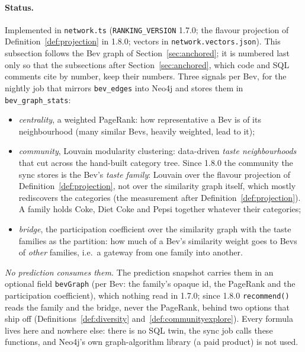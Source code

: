 \documentclass[11pt]{article}
\newcommand{\code}[1]{\texttt{#1}}
\theoremstyle{plain}
\theoremstyle{definition}
\theoremstyle{remark}
\begin{document}
\paragraph{Status.} Implemented in \code{network.ts} (\code{RANKING\_VERSION} 1.7.0; the flavour projection of Definition~\ref{def:projection} in 1.8.0; vectors in \code{network.vectors.json}). This subsection follows the Bev graph of Section~\ref{sec:anchored}; it is numbered last only so that the subsections after Section~\ref{sec:anchored}, which code and SQL comments cite by number, keep their numbers. Three signals per Bev, for the nightly job that mirrors \code{bev\_edges} into Neo4j and stores them in \code{bev\_graph\_stats}:
\begin{itemize}
\item \emph{centrality}, a weighted PageRank: how representative a Bev is of its neighbourhood (many similar Bevs, heavily weighted, lead to it);
\item \emph{community}, Louvain modularity clustering: data-driven \emph{taste neighbourhoods} that cut across the hand-built category tree. Since 1.8.0 the community the sync stores is the Bev's \emph{taste family}: Louvain over the flavour projection of Definition~\ref{def:projection}, not over the similarity graph itself, which mostly rediscovers the categories (the measurement after Definition~\ref{def:projection}). A family holds Coke, Diet Coke and Pepsi together whatever their categories;
\item \emph{bridge}, the participation coefficient over the similarity graph with the taste families as the partition: how much of a Bev's similarity weight goes to Bevs of \emph{other} families, i.e.\ a gateway from one family into another.
\end{itemize}
\emph{No prediction consumes them.} The prediction snapshot carries them in an optional field \code{bevGraph} (per Bev: the family's opaque id, the PageRank and the participation coefficient), which nothing read in 1.7.0; since 1.8.0 \code{recommend()} reads the family and the bridge, never the PageRank, behind two options that ship off (Definitions~\ref{def:diversity} and~\ref{def:communityexplore}). Every formula lives here and nowhere else: there is no SQL twin, the sync job calls these functions, and Neo4j's own graph-algorithm library (a paid product) is not used.
\end{document}
